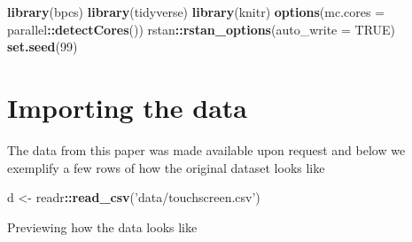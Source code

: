 \documentclass[
]{book}
\newenvironment{Shaded}{\begin{snugshade}}{\end{snugshade}}
\newcommand{\DataTypeTok}[1]{\textcolor[rgb]{0.13,0.29,0.53}{#1}}
\newcommand{\DecValTok}[1]{\textcolor[rgb]{0.00,0.00,0.81}{#1}}
\newcommand{\KeywordTok}[1]{\textcolor[rgb]{0.13,0.29,0.53}{\textbf{#1}}}
\newcommand{\NormalTok}[1]{#1}
\newcommand{\OperatorTok}[1]{\textcolor[rgb]{0.81,0.36,0.00}{\textbf{#1}}}
\newcommand{\OtherTok}[1]{\textcolor[rgb]{0.56,0.35,0.01}{#1}}
\newcommand{\StringTok}[1]{\textcolor[rgb]{0.31,0.60,0.02}{#1}}
\begin{document}
\begin{Shaded}
\begin{Highlighting}[]
\KeywordTok{library}\NormalTok{(bpcs)}
\KeywordTok{library}\NormalTok{(tidyverse)}
\KeywordTok{library}\NormalTok{(knitr)}
\KeywordTok{options}\NormalTok{(}\DataTypeTok{mc.cores =}\NormalTok{ parallel}\OperatorTok{::}\KeywordTok{detectCores}\NormalTok{())}
\NormalTok{rstan}\OperatorTok{::}\KeywordTok{rstan_options}\NormalTok{(}\DataTypeTok{auto_write =} \OtherTok{TRUE}\NormalTok{)}
\KeywordTok{set.seed}\NormalTok{(}\DecValTok{99}\NormalTok{)}
\end{Highlighting}
\end{Shaded}

\hypertarget{importing-the-data-1}{%
\section{Importing the data}\label{importing-the-data-1}}

The data from this paper was made available upon request and below we exemplify a few rows of how the original dataset looks like

\begin{Shaded}
\begin{Highlighting}[]
\NormalTok{d <-}\StringTok{ }\NormalTok{readr}\OperatorTok{::}\KeywordTok{read_csv}\NormalTok{(}\StringTok{'data/touchscreen.csv'}\NormalTok{)}
\end{Highlighting}
\end{Shaded}

Previewing how the data looks like

\begin{Shaded}
\end{Shaded}
\end{document}
